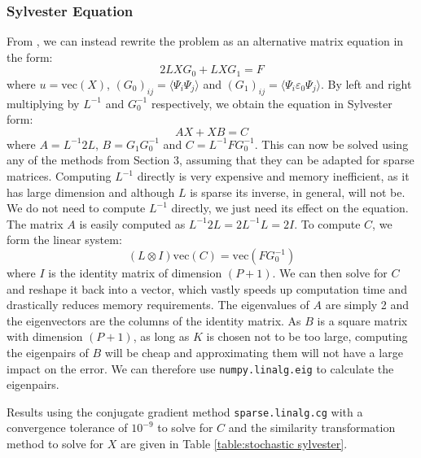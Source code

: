 \documentclass[11pt]{article}
\numberwithin{equation}{section}
\begin{document}
\subsubsection*{Sylvester Equation}
From \cite{Powell}, we can instead rewrite the problem as an alternative matrix equation in the form:
\begin{equation}
2LXG_0 + LXG_1 = F
\end{equation}
where $u = \text{vec}(X)$, $(G_0)_{ij} = \langle \Psi_i \Psi_j \rangle$ and $(G_1)_{ij} = \langle \Psi_i \varepsilon_0 \Psi_j \rangle$. By left and right multiplying by $L^{-1}$ and $G_0^{-1}$ respectively, we obtain the equation in Sylvester form:
\begin{equation}
AX + XB = C
\end{equation}
where $A = L^{-1}2L$, $B = G_1 G_0^{-1}$ and $C = L^{-1} F G_0^{-1}$. This can now be solved using any of the methods from Section 3, assuming that they can be adapted for sparse matrices. Computing $L^{-1}$ directly is very expensive and memory inefficient, as it has large dimension and although $L$ is sparse its inverse, in general, will not be. We do not need to compute $L^{-1}$ directly, we just need its effect on the equation. The matrix $A$ is easily computed as $L^{-1}2L = 2L^{-1}L = 2I$. To compute $C$, we form the linear system:
\begin{equation}
(L \otimes I)\text{vec}(C) = \text{vec}(FG_0^{-1})
\end{equation}
where $I$ is the identity matrix of dimension $(P+1)$. We can then solve for $C$ and reshape it back into a vector, which vastly speeds up computation time and drastically reduces memory requirements. The eigenvalues of $A$ are simply 2 and the eigenvectors are the columns of the identity matrix. As $B$ is a square matrix with dimension $(P+1)$, as long as $K$ is chosen not to be too large, computing the eigenpairs of $B$ will be cheap and approximating them will not have a large impact on the error. We can therefore use \texttt{numpy.linalg.eig} to calculate the eigenpairs.

Results using the conjugate gradient method \texttt{sparse.linalg.cg} with a convergence tolerance of $10^{-9}$ to solve for $C$ and the similarity transformation method to solve for $X$ are given in Table \ref{table:stochastic sylvester}.
\end{document}
